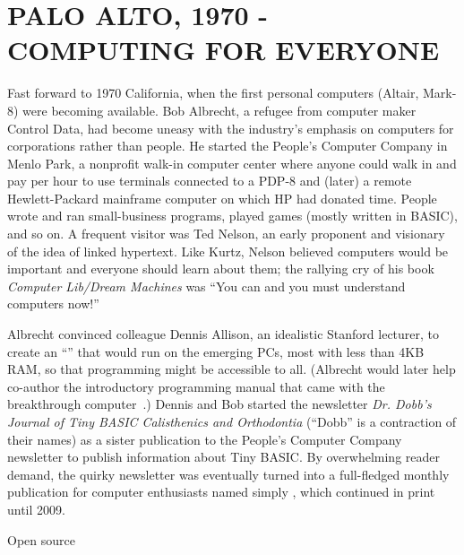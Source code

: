 
\section{PALO ALTO, 1970 - COMPUTING FOR EVERYONE}


Fast forward to 1970 California, when the first personal computers (Altair,
Mark-8) were becoming available.  Bob Albrecht, a refugee from computer
maker Control
Data, had become uneasy with the industry's emphasis on computers for
corporations rather than people.  He 
started the People's Computer Company in Menlo Park, a nonprofit walk-in
computer center where anyone could walk in and pay per hour to use
terminals connected to a PDP-8 and (later) a remote Hewlett-Packard
mainframe computer on which 
HP had donated time.  People wrote and ran small-business programs, played games
(mostly written in BASIC), and so on.
A frequent visitor was Ted Nelson, an early proponent and visionary of
the idea of linked hypertext.  Like Kurtz, Nelson believed computers
would be important and everyone should learn about them; the rallying
cry of his book \emph{Computer Lib/Dream Machines} was ``You can and
you must understand computers now!''

Albrecht convinced colleague Dennis Allison, an idealistic Stanford
lecturer, to create an  ``'' that would run
on the emerging PCs, most with less than 4KB RAM, so that programming
might be accessible to all.  (Albrecht would later help co-author the introductory programming manual
that came with the breakthrough 
computer~\cite{commodore}.) 
Dennis and Bob started the newsletter \emph{Dr. Dobb's Journal of Tiny BASIC
Calisthenics and Orthodontia} (``Dobb'' is a contraction of their names)
as a sister publication to the People's Computer Company newsletter to
publish information about Tiny BASIC.
By overwhelming reader demand, the quirky newsletter was eventually
turned into a full-fledged monthly publication for computer enthusiasts
named simply , which continued in print
until 2009.



\begin{milestone}{Open source}

\end{milestone}
